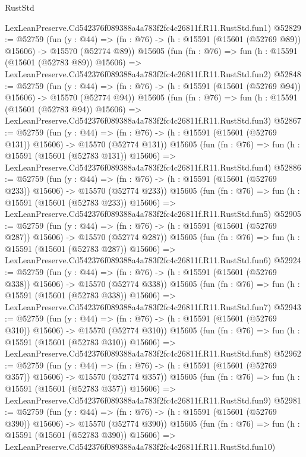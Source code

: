 \begin{lexlean}{RustStd}
\begin{coremodule}
    LexLeanPreserve.Cd542376f089388a4a783f2fc4c26811f.R11.RustStd.fun1)
@52829 := @52759
    (fun (y : @44) =>
    (fn : @76) -> (h : @15591 (@15601 (@52769 @89)) @15606) -> @15570 (@52774 @89))
    @15605
    (fun (fn : @76) =>
    fun (h : @15591 (@15601 (@52783 @89)) @15606) =>
    LexLeanPreserve.Cd542376f089388a4a783f2fc4c26811f.R11.RustStd.fun2)
@52848 := @52759
    (fun (y : @44) =>
    (fn : @76) -> (h : @15591 (@15601 (@52769 @94)) @15606) -> @15570 (@52774 @94))
    @15605
    (fun (fn : @76) =>
    fun (h : @15591 (@15601 (@52783 @94)) @15606) =>
    LexLeanPreserve.Cd542376f089388a4a783f2fc4c26811f.R11.RustStd.fun3)
@52867 := @52759
    (fun (y : @44) =>
    (fn : @76) -> (h : @15591 (@15601 (@52769 @131)) @15606) -> @15570 (@52774 @131))
    @15605
    (fun (fn : @76) =>
    fun (h : @15591 (@15601 (@52783 @131)) @15606) =>
    LexLeanPreserve.Cd542376f089388a4a783f2fc4c26811f.R11.RustStd.fun4)
@52886 := @52759
    (fun (y : @44) =>
    (fn : @76) -> (h : @15591 (@15601 (@52769 @233)) @15606) -> @15570 (@52774 @233))
    @15605
    (fun (fn : @76) =>
    fun (h : @15591 (@15601 (@52783 @233)) @15606) =>
    LexLeanPreserve.Cd542376f089388a4a783f2fc4c26811f.R11.RustStd.fun5)
@52905 := @52759
    (fun (y : @44) =>
    (fn : @76) -> (h : @15591 (@15601 (@52769 @287)) @15606) -> @15570 (@52774 @287))
    @15605
    (fun (fn : @76) =>
    fun (h : @15591 (@15601 (@52783 @287)) @15606) =>
    LexLeanPreserve.Cd542376f089388a4a783f2fc4c26811f.R11.RustStd.fun6)
@52924 := @52759
    (fun (y : @44) =>
    (fn : @76) -> (h : @15591 (@15601 (@52769 @338)) @15606) -> @15570 (@52774 @338))
    @15605
    (fun (fn : @76) =>
    fun (h : @15591 (@15601 (@52783 @338)) @15606) =>
    LexLeanPreserve.Cd542376f089388a4a783f2fc4c26811f.R11.RustStd.fun7)
@52943 := @52759
    (fun (y : @44) =>
    (fn : @76) -> (h : @15591 (@15601 (@52769 @310)) @15606) -> @15570 (@52774 @310))
    @15605
    (fun (fn : @76) =>
    fun (h : @15591 (@15601 (@52783 @310)) @15606) =>
    LexLeanPreserve.Cd542376f089388a4a783f2fc4c26811f.R11.RustStd.fun8)
@52962 := @52759
    (fun (y : @44) =>
    (fn : @76) -> (h : @15591 (@15601 (@52769 @357)) @15606) -> @15570 (@52774 @357))
    @15605
    (fun (fn : @76) =>
    fun (h : @15591 (@15601 (@52783 @357)) @15606) =>
    LexLeanPreserve.Cd542376f089388a4a783f2fc4c26811f.R11.RustStd.fun9)
@52981 := @52759
    (fun (y : @44) =>
    (fn : @76) -> (h : @15591 (@15601 (@52769 @390)) @15606) -> @15570 (@52774 @390))
    @15605
    (fun (fn : @76) =>
    fun (h : @15591 (@15601 (@52783 @390)) @15606) =>
    LexLeanPreserve.Cd542376f089388a4a783f2fc4c26811f.R11.RustStd.fun10)

\end{coremodule}
\end{lexlean}
